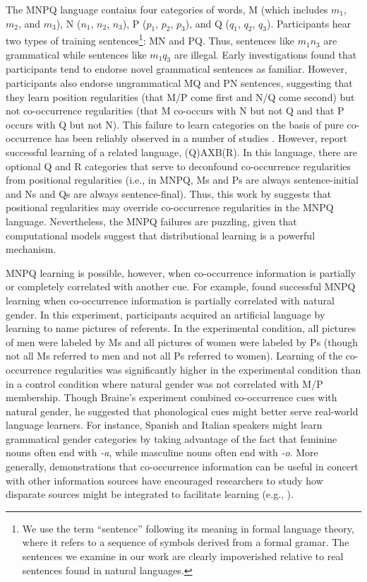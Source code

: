 \documentclass[man,floatsintext]{apa6}
\begin{document}
The MNPQ language contains four categories of words, M (which includes $m_1$, $m_2$, and $m_3$), N ($n_1$, $n_2$, $n_3$), P ($p_1$, $p_2$, $p_3$), and Q ($q_1$, $q_2$, $q_3$). Participants hear two types of training sentences\footnote{ We use the term ``sentence'' following its meaning in formal language theory, where it refers to a sequence of symbols derived from a formal gramar. The sentences we examine in our work are clearly impoverished relative to real sentences found in natural languages.}: MN and PQ. Thus, sentences like $m_1 n_3$ are grammatical while sentences like $m_1 q_3$ are illegal. Early investigations \citep{braine1966, smith1966} found that participants tend to endorse novel grammatical sentences as familiar. However, participants also endorse ungrammatical MQ and PN sentences, suggesting that they learn position regularities (that M/P come first and N/Q come second) but not co-occurrence regularities (that M co-occurs with N but not Q and that P occurs with Q but not N). This failure to learn categories on the basis of pure co-occurrence has been reliably observed in a number of studies \citep{braine1987, brooks1993, frigo1998, kempe2001, gerken2005, lany2010, frank2011}. However, \citet[Experiment 5]{reeder2009} report successful learning of a related language, (Q)AXB(R). In this language, there are optional Q and R categories that serve to deconfound co-occurrence regularities from positional regularities (i.e., in MNPQ, Ms and Ps are always sentence-initial and Ns and Qs are always sentence-final). Thus, this work by \citeauthor{reeder2009} suggests that positional regularities may override co-occurrence regularities in the MNPQ language. Nevertheless, the MNPQ failures are puzzling, given that computational models suggest that distributional learning is a powerful mechanism.

MNPQ learning is possible, however, when co-occurrence information is partially or completely correlated with another cue. For example, \citet{braine1987} found successful MNPQ learning when co-occurrence information is partially correlated with natural gender. In this experiment, participants acquired an artificial language by learning to name pictures of referents. In the experimental condition, all pictures of men were labeled by Ms and all pictures of women were labeled by Ps (though not all Ms referred to men and not all Ps referred to women). Learning of the co-occurrence regularities was significantly higher in the experimental condition than in a control condition where natural gender was not correlated with M/P membership. Though Braine's experiment combined co-occurrence cues with natural gender, he suggested that phonological cues might better serve real-world language learners. For instance, Spanish and Italian speakers might learn grammatical gender categories by taking advantage of the fact that feminine nouns often end with \emph{-a}, while masculine nouns often end with \emph{-o}. More generally, demonstrations that co-occurrence information can be useful in concert with other information sources have encouraged researchers to study how disparate sources might be integrated to facilitate learning (e.g., \citealp{monaghan2005, johns2012}).
\end{document}
